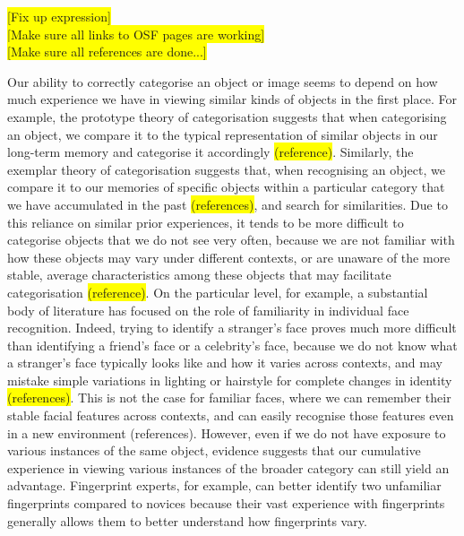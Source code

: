 \documentclass[
  english,
  man]{apa6}
\begin{document}
\colorbox{yellow}{[Fix up expression]}\\
\colorbox{yellow}{[Make sure all links to OSF pages are working]}\\
\colorbox{yellow}{[Make sure all references are done...]}

Our ability to correctly categorise an object or image seems to depend on how much experience we have in viewing similar kinds of objects in the first place. For example, the prototype theory of categorisation suggests that when categorising an object, we compare it to the typical representation of similar objects in our long-term memory and categorise it accordingly \colorbox{yellow}{(reference)}. Similarly, the exemplar theory of categorisation suggests that, when recognising an object, we compare it to our memories of specific objects within a particular category that we have accumulated in the past \colorbox{yellow}{(references)}, and search for similarities. Due to this reliance on similar prior experiences, it tends to be more difficult to categorise objects that we do not see very often, because we are not familiar with how these objects may vary under different contexts, or are unaware of the more stable, average characteristics among these objects that may facilitate categorisation \colorbox{yellow}{(reference)}. On the particular level, for example, a substantial body of literature has focused on the role of familiarity in individual face recognition. Indeed, trying to identify a stranger's face proves much more difficult than identifying a friend's face or a celebrity's face, because we do not know what a stranger's face typically looks like and how it varies across contexts, and may mistake simple variations in lighting or hairstyle for complete changes in identity \colorbox{yellow}{(references)}. This is not the case for familiar faces, where we can remember their stable facial features across contexts, and can easily recognise those features even in a new environment (references). However, even if we do not have exposure to various instances of the same object, evidence suggests that our cumulative experience in viewing various instances of the broader category can still yield an advantage. Fingerprint experts, for example, can better identify two unfamiliar fingerprints compared to novices because their vast experience with fingerprints generally allows them to better understand how fingerprints vary.
\end{document}
